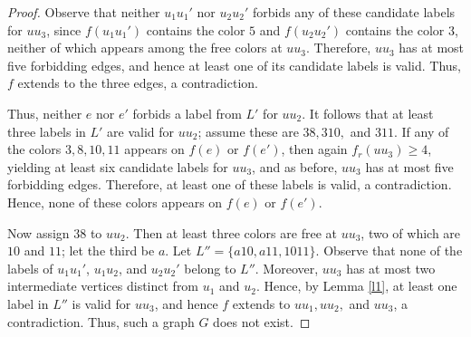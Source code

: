 \documentclass[10pt,a4paper]{amsart}
\begin{document}
\begin{proof}
\noindent Observe that neither $u_1u_1'$ nor $u_2u_2'$ forbids any of these candidate labels for $uu_3$, since $f(u_1u_1')$ contains the color $5$ and $f(u_2u_2')$ contains the color $3$, neither of which appears among the free colors at $uu_3$. Therefore, $uu_3$ has at most five forbidding edges, and hence at least one of its candidate labels is valid. Thus, $f$ extends to the three edges, a contradiction.

\noindent Thus, neither $e$ nor $e'$ forbids a label from $L'$ for $uu_2$. It follows that at least three labels in $L'$ are valid for $uu_2$; assume these are $38, 310,$ and $311$. If any of the colors $3,8,10,11$ appears on $f(e)$ or $f(e')$, then again $f_r(uu_3)\ge 4$, yielding at least six candidate labels for $uu_3$, and as before, $uu_3$ has at most five forbidding edges. Therefore, at least one of these labels is valid, a contradiction. Hence, none of these colors appears on $f(e)$ or $f(e')$.

Now assign $38$ to $uu_2$. Then at least three colors are free at $uu_3$, two of which are $10$ and $11$; let the third be $a$. Let $L'' = \{a10, a11, 1011\}$. Observe that none of the labels of $u_1u_1'$, $u_1u_2$, and $u_2u_2'$ belong to $L''$. Moreover, $uu_3$ has at most two intermediate vertices distinct from $u_1$ and $u_2$. Hence, by Lemma \ref{l1}, at least one label in $L''$ is valid for $uu_3$, and hence $f$ extends to  $uu_1, uu_2,$ and $uu_3$, a contradiction. Thus, such a graph $G$ does not exist.\end{proof}
\end{document}
